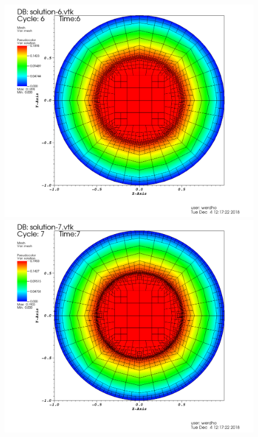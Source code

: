 \documentclass[11pt,fullpage]{article}
\theoremstyle{lemma}
\theoremstyle{definition}
\theoremstyle{lemma}
\begin{document}
\begin{figure}[!ht]
\begin{minipage}{.45\paperwidth}
		\centering
		\includegraphics[scale=.12]{Step6-7.png}
	\end{minipage}%
	\begin{minipage}{.4\paperwidth}
		\centering
		\includegraphics[scale=.12]{Step6-8.png}
	\end{minipage}
\end{figure}
\clearpage
\end{document}
